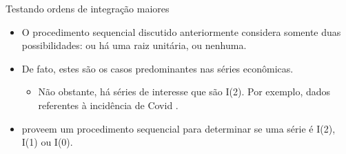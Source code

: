 \documentclass[11pt]{beamer}
\begin{document}
\begin{frame}{Testando ordens de integração maiores}
	\begin{itemize}
		\item O procedimento sequencial discutido anteriormente considera somente duas possibilidades: ou há uma raiz unitária, ou nenhuma.
		\item De fato, estes são os casos predominantes nas séries econômicas.
		\begin{itemize}
			\item Não obstante, há séries de interesse que são I(2). Por exemplo, dados referentes à incidência de Covid \citep{Chernozhukov2021}.
		\end{itemize}
		\item \citet{Dickey1987} proveem um procedimento sequencial para determinar se uma série é I(2), I(1) ou I(0).
	\end{itemize}
\end{frame}
\end{document}

